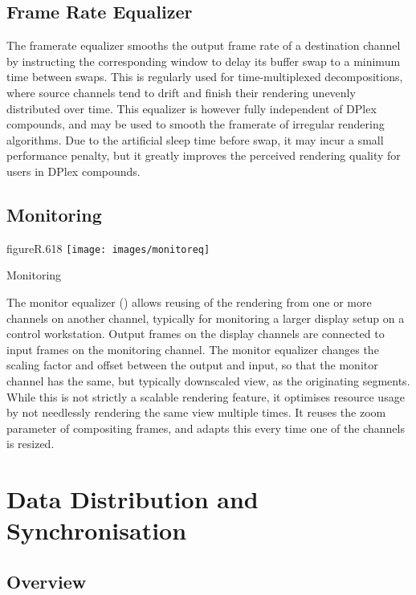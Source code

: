 \section{Frame Rate Equalizer}\label{sFramerateEq}

The framerate equalizer smooths the output frame rate of a destination channel
by instructing the corresponding window to delay its buffer swap to a minimum
time between swaps. This is regularly used for time-multiplexed decompositions,
where source channels tend to drift and finish their rendering unevenly
distributed over time. This equalizer is however fully independent of DPlex
compounds, and may be used to smooth the framerate of irregular rendering
algorithms. Due to the artificial sleep time before swap, it may incur a small
performance penalty, but it greatly improves the perceived rendering quality for
users in DPlex compounds.

\section{Monitoring}

\begin{wrapfloat}{figure}{R}{.618\textwidth}
  \texttt{[image: images/monitoreq]}
  \caption{\label{fmonitor}Monitoring}
\end{wrapfloat}

The monitor equalizer () allows reusing of the rendering from one
or more channels on another channel, typically for monitoring a larger display
setup on a control workstation. Output frames on the display channels are
connected to input frames on the monitoring channel. The monitor equalizer
changes the scaling factor and offset between the output and input, so that the
monitor channel has the same, but typically downscaled view, as the originating
segments. While this is not strictly a scalable rendering feature, it optimises
resource usage by not needlessly rendering the same view multiple times. It
reuses the zoom parameter of compositing frames, and adapts this every time one
of the channels is resized.


\chapter{Data Distribution and Synchronisation}\label{sCollage}

\section{Overview}

